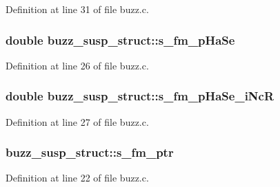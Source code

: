 Definition at line 31 of file buzz.\+c.

\subsubsection[{\texorpdfstring{s\+\_\+fm\+\_\+p\+Ha\+Se}{s_fm_pHaSe}}]{\setlength{\rightskip}{0pt plus 5cm}double buzz\+\_\+susp\+\_\+struct\+::s\+\_\+fm\+\_\+p\+Ha\+Se}\hypertarget{structbuzz__susp__struct_a8c443a0294c40932c2ee3b797007d1b5}{}\label{structbuzz__susp__struct_a8c443a0294c40932c2ee3b797007d1b5}


Definition at line 26 of file buzz.\+c.

\subsubsection[{\texorpdfstring{s\+\_\+fm\+\_\+p\+Ha\+Se\+\_\+i\+NcR}{s_fm_pHaSe_iNcR}}]{\setlength{\rightskip}{0pt plus 5cm}double buzz\+\_\+susp\+\_\+struct\+::s\+\_\+fm\+\_\+p\+Ha\+Se\+\_\+i\+NcR}\hypertarget{structbuzz__susp__struct_aa806d3f3517b90d24ff968fd43c4291f}{}\label{structbuzz__susp__struct_aa806d3f3517b90d24ff968fd43c4291f}


Definition at line 27 of file buzz.\+c.

\subsubsection[{\texorpdfstring{s\+\_\+fm\+\_\+ptr}{s_fm_ptr}}]{ buzz\+\_\+susp\+\_\+struct\+::s\+\_\+fm\+\_\+ptr}\hypertarget{structbuzz__susp__struct_ab0b74e83827de47d91b4beb6146822d3}{}\label{structbuzz__susp__struct_ab0b74e83827de47d91b4beb6146822d3}


Definition at line 22 of file buzz.\+c.

